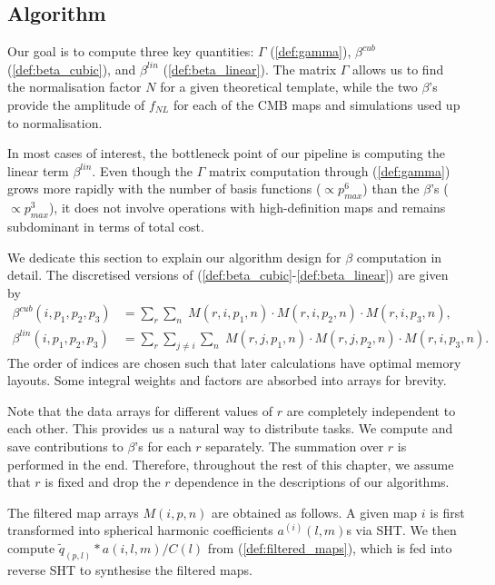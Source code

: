 \subsection{Algorithm}

Our goal is to compute three key quantities: $\Gamma$ (\ref{def:gamma}), $\beta^{cub}$ (\ref{def:beta_cubic}), and $\beta^{lin}$ (\ref{def:beta_linear}). The matrix $\Gamma$ allows us to find the normalisation factor $N$ for a given theoretical template, while the two $\beta$'s provide the amplitude of $f_{NL}$ for each of the CMB maps and simulations used up to normalisation.

In most cases of interest, the bottleneck point of our pipeline is computing the linear term $\beta^{lin}$. Even though the $\Gamma$ matrix computation through (\ref{def:gamma}) grows more rapidly with the number of basis functions ($\propto p_{max}^6$) than the $\beta$'s ($\propto p_{max}^3$), it does not involve operations with high-definition maps and remains subdominant in terms of total cost.

We dedicate this section to explain our algorithm design for $\beta$ computation in detail. The discretised versions of (\ref{def:beta_cubic}-\ref{def:beta_linear}) are given by
\begin{align}
	\beta^{cub}(i, p_1,p_2,p_3) &= \sum_r \sum_n \; M(r, i, p_1, n) \cdot M(r, i, p_2, n) \cdot M(r, i, p_3, n), \\
	\beta^{lin}(i, p_1,p_2,p_3) &= \sum_r \sum_{j \neq i} \sum_n \; M(r, j, p_1, n) \cdot M(r, j, p_2, n) \cdot M(r, i, p_3, n).
\end{align}
The order of indices are chosen such that later calculations have optimal memory layouts. Some integral weights and factors are absorbed into arrays for brevity.

Note that the data arrays for different values of $r$ are completely independent to each other. This provides us a natural way to distribute tasks. We compute and save contributions to $\beta$'s for each $r$ separately. The summation over $r$ is performed in the end. Therefore, throughout the rest of this chapter, we assume that $r$ is fixed and drop the $r$ dependence in the descriptions of our algorithms.

The filtered map arrays $M(i,p,n)$ are obtained as follows. A given map $i$ is first transformed into spherical harmonic coefficients $a^{(i)}(l,m)$s via SHT. We then compute $\tilde{q}_(p,l) * a(i,l,m) / C(l)$ from (\ref{def:filtered_maps}), which is fed into reverse SHT to synthesise the filtered maps.

